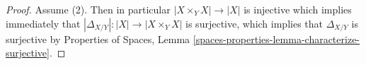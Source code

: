 \documentclass[10pt,a4paper]{amsart}
\theoremstyle{plain}
\theoremstyle{definition}
\theoremstyle{remark}
\numberwithin{equation}{subsection}
\begin{document}
\begin{proof}
\medskip\noindent
Assume (2). Then in particular $|X \times_Y X| \to |X|$ is injective
which implies immediately that
$|\Delta_{X/Y}| : |X| \to |X \times_Y X|$ is surjective, which
implies that $\Delta_{X/Y}$ is surjective by
Properties of Spaces,
Lemma \ref{spaces-properties-lemma-characterize-surjective}.
\end{proof}
\end{document}
